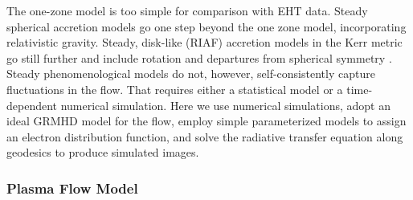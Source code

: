 The one-zone model is too simple for comparison with EHT data.
Steady spherical accretion models \citep[e.g.,][]{2019ApJ...885L..33N, 2021arXiv211102178B} go one  step beyond the one zone model, incorporating relativistic gravity.
Steady, disk-like (RIAF) accretion models in the Kerr metric go still further and include rotation and departures from spherical symmetry \citep[e.g.,][]{2009ApJ...697...45B, 2009ApJ...706..960H,2018ApJ...863..148P}.
Steady phenomenological models do not, however, self-consistently capture fluctuations in the flow.
That requires either a statistical model \citep{2021ApJ...906...39L} or a time-dependent numerical simulation.
Here we
use numerical simulations,
adopt an ideal GRMHD model for the flow,
employ simple parameterized models to assign an electron distribution function, and
solve the radiative transfer equation along geodesics to produce simulated images.

\subsubsection{Plasma Flow Model}

